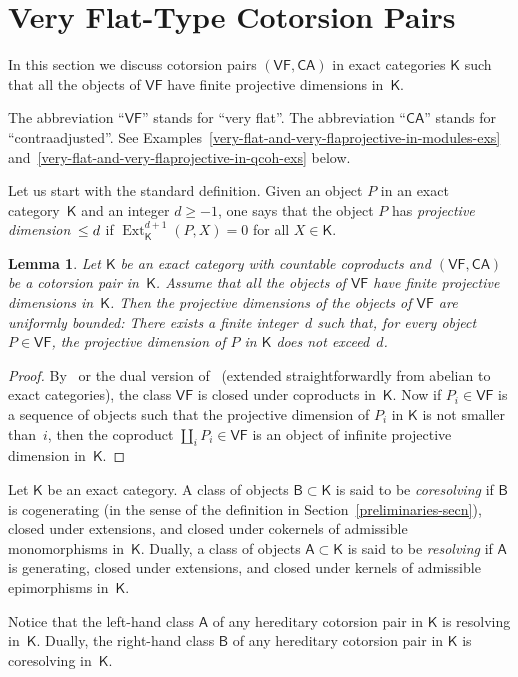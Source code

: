 \documentclass[12pt,a4paper]{amsart}
\newcommand{\+}{\nobreakdash-}
\renewcommand{\:}{\colon}
\DeclareMathOperator{\Ext}{Ext}
\newcommand{\sA}{\mathsf A}
\newcommand{\sB}{\mathsf B}
\newcommand{\sK}{\mathsf K}
\newcommand{\VF}{\mathsf{VF}}
\newcommand{\CA}{\mathsf{CA}}
\newcommand{\Section}[1]{\bigskip\section{#1}\medskip}
\theoremstyle{plain}
\newtheorem{lem}[thm]{Lemma}
\theoremstyle{definition}
\begin{document}
\Section{Very Flat-Type Cotorsion Pairs}  \label{very-flat-type-secn}

 In this section we discuss cotorsion pairs $(\VF,\CA)$ in exact
categories $\sK$ such that all the objects of $\VF$ have finite
projective dimensions in~$\sK$.

 The abbreviation ``$\VF$'' stands for ``very flat''.
 The abbreviation ``$\CA$'' stands for ``contraadjusted''.
 See Examples~\ref{very-flat-and-very-flaprojective-in-modules-exs}
and~\ref{very-flat-and-very-flaprojective-in-qcoh-exs} below.

 Let us start with the standard definition.
 Given an object $P$ in an exact category~$\sK$ and an integer $d\ge-1$,
one says that the object $P$ has \emph{projective
dimension\/~$\le\nobreak d$} if $\Ext^{d+1}_\sK(P,X)=0$ for all
$X\in\sK$.

\begin{lem} \label{finite-projective-dimensions-are-bounded}
 Let\/ $\sK$ be an exact category with countable coproducts and
$(\VF,\CA)$ be a cotorsion pair in\/~$\sK$.
 Assume that all the objects of\/ $\VF$ have finite projective
dimensions in\/~$\sK$.
 Then the projective dimensions of the objects of\/ $\VF$ are
uniformly bounded: There exists a finite integer~$d$ such that, for
every object $P\in\VF$, the projective dimension of $P$ in\/ $\sK$
does not exceed~$d$.
\end{lem}

\begin{proof}
 By~\cite[Corollary 8.3]{CoFu} or the dual version
of~\cite[Corollary A.2]{CoSt} (extended straightforwardly from
abelian to exact categories), the class $\VF$ is closed under
coproducts in~$\sK$.
 Now if $P_i\in\VF$ is a sequence of objects such that the projective
dimension of $P_i$ in $\sK$ is not smaller than~$i$, then
the coproduct $\coprod_i P_i\in\VF$ is an object of infinite projective
dimension in~$\sK$.
\end{proof}

 Let $\sK$ be an exact category.
 A class of objects $\sB\subset\sK$ is said to be \emph{coresolving}
if $\sB$ is cogenerating (in the sense of the definition in
Section~\ref{preliminaries-secn}), closed under extensions, and closed
under cokernels of admissible monomorphisms in~$\sK$.
 Dually, a class of objects $\sA\subset\sK$ is said to be
\emph{resolving} if $\sA$ is generating, closed under extensions, and
closed under kernels of admissible epimorphisms in~$\sK$.

 Notice that the left-hand class $\sA$ of any hereditary cotorsion pair
in $\sK$ is resolving in~$\sK$.
 Dually, the right-hand class $\sB$ of any hereditary cotorsion pair in
$\sK$ is coresolving in~$\sK$.
\end{document}
